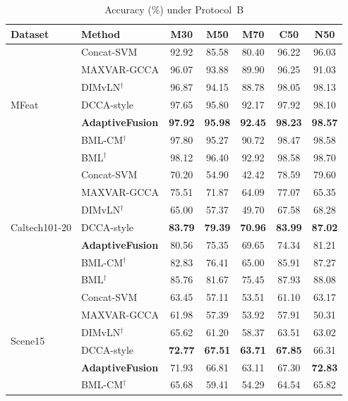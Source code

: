 \begin{table}[!t]
\caption{Accuracy (\%) under Protocol~B}
\label{tab:mainB}
\centering
\footnotesize
\setlength{\tabcolsep}{2.5pt}
\begin{tabular}{llccccc}
\toprule
Dataset & Method & M30 & M50 & M70 & C50 & N50 \\
\midrule
\multirow{7}{*}{MFeat} & Concat-SVM & 92.92 & 85.58 & 80.40 & 96.22 & 96.03 \\
 & MAXVAR-GCCA & 96.07 & 93.88 & 89.90 & 96.25 & 91.03 \\
 & DIMvLN$^\dagger$ & 96.87 & 94.15 & 88.78 & 98.05 & 98.13 \\
 & DCCA-style & 97.65 & 95.80 & 92.17 & 97.92 & 98.10 \\
 & \textbf{AdaptiveFusion} & \textbf{97.92} & \textbf{95.98} & \textbf{92.45} & \textbf{98.23} & \textbf{98.57} \\
\cmidrule(lr){2-7}
 & BML-CM$^\dagger$ & 97.80 & 95.27 & 90.72 & 98.47 & 98.58 \\
 & BML$^\dagger$ & 98.12 & 96.40 & 92.92 & 98.58 & 98.70 \\
\midrule
\multirow{7}{*}{Caltech101-20} & Concat-SVM & 70.20 & 54.90 & 42.42 & 78.59 & 79.60 \\
 & MAXVAR-GCCA & 75.51 & 71.87 & 64.09 & 77.07 & 65.35 \\
 & DIMvLN$^\dagger$ & 65.00 & 57.37 & 49.70 & 67.58 & 68.28 \\
 & DCCA-style & \textbf{83.79} & \textbf{79.39} & \textbf{70.96} & \textbf{83.99} & \textbf{87.02} \\
 & \textbf{AdaptiveFusion} & 80.56 & 75.35 & 69.65 & 74.34 & 81.21 \\
\cmidrule(lr){2-7}
 & BML-CM$^\dagger$ & 82.83 & 76.41 & 65.00 & 85.91 & 87.27 \\
 & BML$^\dagger$ & 85.76 & 81.67 & 75.45 & 87.93 & 88.08 \\
\midrule
\multirow{7}{*}{Scene15} & Concat-SVM & 63.45 & 57.11 & 53.51 & 61.10 & 63.17 \\
 & MAXVAR-GCCA & 61.98 & 57.39 & 53.92 & 57.91 & 50.31 \\
 & DIMvLN$^\dagger$ & 65.62 & 61.20 & 58.37 & 63.51 & 63.02 \\
 & DCCA-style & \textbf{72.77} & \textbf{67.51} & \textbf{63.71} & \textbf{67.85} & 66.31 \\
 & \textbf{AdaptiveFusion} & 71.93 & 66.81 & 63.11 & 67.30 & \textbf{72.83} \\
\cmidrule(lr){2-7}
 & BML-CM$^\dagger$ & 65.68 & 59.41 & 54.29 & 64.54 & 65.82 \\

\end{tabular}
\end{table}
